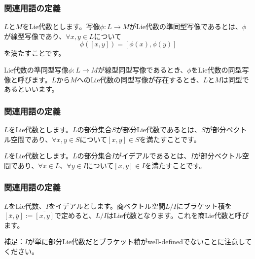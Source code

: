 \documentclass{beamer}
\begin{document}
\begin{frame}
    \frametitle{関連用語の定義}

    \begin{definition}[準同型写像]
        $L$と$M$をLie代数とします。写像$ϕ:L→M$がLie代数の準同型写像であるとは、$ϕ$が線型写像であり、$∀x,y∈L$について
        \begin{equation}
            ϕ([x,y])=[ϕ(x),ϕ(y)]
        \end{equation}
        を満たすことです。
    \end{definition}

    \begin{definition}[同型]
        Lie代数の準同型写像$ϕ:L→M$が線型同型写像であるとき、$ϕ$をLie代数の同型写像と呼びます。$L$から$M$へのLie代数の同型写像が存在するとき、$L$と$M$は同型であるといいます。
    \end{definition}
\end{frame}

\begin{frame}
    \frametitle{関連用語の定義}

    \begin{definition}[部分Lie代数]
        $L$をLie代数とします。$L$の部分集合$S$が部分Lie代数であるとは、$S$が部分ベクトル空間であり、$∀x,y∈S$について$[x,y]∈S$を満たすことです。
    \end{definition}

    \begin{definition}[イデアル]
        $L$をLie代数とします。$L$の部分集合$I$がイデアルであるとは、$I$が部分ベクトル空間であり、$∀x∈L$、$∀y∈I$について$[x,y]∈I$を満たすことです。
    \end{definition}
\end{frame}

\begin{frame}
    \frametitle{関連用語の定義}

    \begin{definition}[商Lie代数]
        $L$をLie代数、$I$をイデアルとします。商ベクトル空間$L/I$にブラケット積を$[\overline{x},\overline{y}]:=\overline{[x,y]}$で定めると、$L/I$はLie代数となります。これを商Lie代数と呼びます。
    \end{definition}

    補足：$I$が単に部分Lie代数だとブラケット積がwell-definedでないことに注意してください。
\end{frame}
\end{document}
